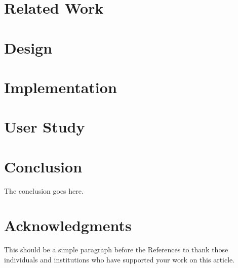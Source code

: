 \documentclass[lettersize,journal]{IEEEtran}
\begin{document}
 \section{Related Work}\label{sec:research}
 


 \section{Design}\label{sec:design}
 


 \section{Implementation}\label{sec:implementation}
 

 \section{User Study}\label{sec:user_study}
 


 \section{Conclusion}\label{sec:conclusion}
 The conclusion goes here.


 \section*{Acknowledgments}
 This should be a simple paragraph before the References to thank those individuals and institutions who have supported your work on this article.







\clearpage

 
 
\end{document}
